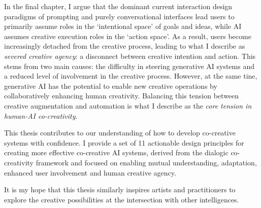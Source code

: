 In the final chapter, I argue that the dominant current interaction design paradigms of prompting and purely conversational interfaces lead users to primarily assume roles in the `intentional space’ of goals and ideas, while AI assumes creative execution roles in the `action space’. As a result, users become increasingly detached from the creative process, leading to what I describe as \textit{severed creative agency}: a disconnect between creative intention and action. This stems from two main causes: the difficulty in steering generative AI systems and a reduced level of involvement in the creative process. However, at the same tine, generative AI has the potential to enable new creative operations by collaboratively enhancing human creativity. Balancing this tension between creative augmentation and automation is what I describe as the \textit{core tension in human-AI co-creativity}. 

This thesis contributes to our understanding of how to develop co-creative systems with confidence. I provide a set of 11 actionable design principles for creating more effective co-creative AI systems, derived from the dialogic co-creativity framework and focused on enabling mutual understanding, adaptation, enhanced user involvement and human creative agency.

It is my hope that this thesis similarly inspires artists and practitioners to explore the creative possibilities at the intersection with other intelligences.
